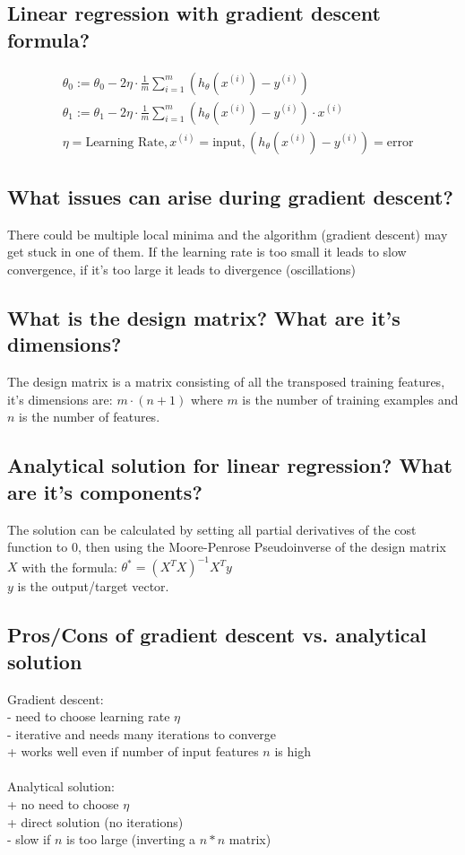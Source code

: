 \documentclass[12pt]{scrartcl}
\begin{document}
\subsection{Linear regression with gradient descent formula?}
\begin{align*}
&\theta_0:= \theta_0 - 2\eta \cdot \frac{1}{m} \sum_{i=1}^{m}(h_\theta(x^{(i)})-y^{(i)}) \\
&\theta_1:= \theta_1 - 2\eta \cdot \frac{1}{m} \sum_{i=1}^{m}(h_\theta(x^{(i)})-y^{(i)}) \cdot x^{(i)} \\
&\eta=\text{Learning Rate},x^{(i)}=\text{input},(h_\theta(x^{(i)})-y^{(i)})=\text{error} 
\end{align*}

\subsection{What issues can arise during gradient descent?}
There could be multiple local minima and the algorithm (gradient descent) may get stuck in one of them. If the learning rate is too small it leads to slow convergence, if it's too large it leads to divergence (oscillations)

\subsection{What is the design matrix? What are it's dimensions?}
The design matrix is a matrix consisting of all the transposed training features, it's dimensions are: $m \cdot (n+1)$ where $m$ is the number of training examples and $n$ is the number of features.

\subsection{Analytical solution for linear regression? What are it's components?}
The solution can be calculated by setting all partial derivatives of the cost function to 0, then using the Moore-Penrose Pseudoinverse of the design matrix $X$ with the formula: $\theta^* = (X^T X)^{-1}X^Ty$ \\
$y$ is the output/target vector.

\subsection{Pros/Cons of gradient descent vs. analytical solution}
Gradient descent:\\
- need to choose learning rate $\eta$ \\
- iterative and needs many iterations to converge \\
+ works well even if number of input features $n$ is high \\
\\
Analytical solution: \\
+ no need to choose $\eta$ \\
+ direct solution (no iterations) \\
- slow if $n$ is too large (inverting a $n*n$ matrix)
\end{document}
